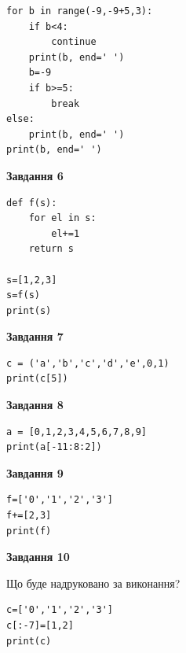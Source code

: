 \documentclass[12pt, ukrainian]{article}
\begin{document}
{{{{{{{{{{{{{\begin{minipage}[t]{10.5cm}
\begin{verbatim}
for b in range(-9,-9+5,3):
    if b<4:
        continue
    print(b, end=' ')
    b=-9
    if b>=5:
        break
else:
    print(b, end=' ')
print(b, end=' ')
\end{verbatim}



\begin{center}
\textbf{Завдання 6}
\end{center}

\begin{verbatim}
def f(s):
    for el in s:
        el+=1
    return s

s=[1,2,3]
s=f(s)
print(s)
\end{verbatim}



\begin{center}
\textbf{Завдання 7}
\end{center}

\begin{verbatim}
c = ('a','b','c','d','e',0,1)
print(c[5])
\end{verbatim}



\begin{center}
\textbf{Завдання 8}
\end{center}

\begin{verbatim}
a = [0,1,2,3,4,5,6,7,8,9]
print(a[-11:8:2])
\end{verbatim}



\begin{center}
\textbf{Завдання 9}
\end{center}

\begin{verbatim}
f=['0','1','2','3']
f+=[2,3]
print(f)
\end{verbatim}



\begin{center}
\textbf{Завдання 10}
\end{center}
Що буде надруковано за виконання?\par
\begin{verbatim}
c=['0','1','2','3']
c[:-7]=[1,2]
print(c)
\end{verbatim}

\end{minipage}

}
\newpage

}}}}}}}}}}}}
\end{document}
